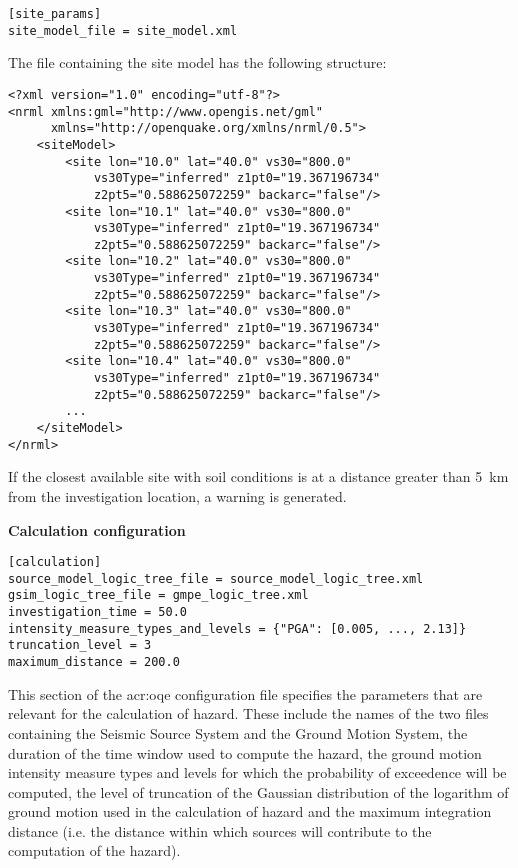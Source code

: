 \begin{verbatim}
[site_params]
site_model_file = site_model.xml
\end{verbatim}

The file containing the site model has the following structure:

\begin{verbatim}
<?xml version="1.0" encoding="utf-8"?>
<nrml xmlns:gml="http://www.opengis.net/gml"
      xmlns="http://openquake.org/xmlns/nrml/0.5">
    <siteModel>
        <site lon="10.0" lat="40.0" vs30="800.0" 
            vs30Type="inferred" z1pt0="19.367196734"
            z2pt5="0.588625072259" backarc="false"/>
        <site lon="10.1" lat="40.0" vs30="800.0" 
            vs30Type="inferred" z1pt0="19.367196734"
            z2pt5="0.588625072259" backarc="false"/>
        <site lon="10.2" lat="40.0" vs30="800.0" 
            vs30Type="inferred" z1pt0="19.367196734"
            z2pt5="0.588625072259" backarc="false"/>
        <site lon="10.3" lat="40.0" vs30="800.0" 
            vs30Type="inferred" z1pt0="19.367196734"
            z2pt5="0.588625072259" backarc="false"/>
        <site lon="10.4" lat="40.0" vs30="800.0" 
            vs30Type="inferred" z1pt0="19.367196734"
            z2pt5="0.588625072259" backarc="false"/>
        ...
    </siteModel>
</nrml>
\end{verbatim}
%

If the closest available site with soil conditions is at a distance greater than 5~km from the investigation location, a warning is generated.

\textbf{Calculation configuration}
\label{sec:calculation_configuration}

\begin{verbatim}
[calculation]
source_model_logic_tree_file = source_model_logic_tree.xml
gsim_logic_tree_file = gmpe_logic_tree.xml
investigation_time = 50.0
intensity_measure_types_and_levels = {"PGA": [0.005, ..., 2.13]}
truncation_level = 3
maximum_distance = 200.0
\end{verbatim}

This section of the \gls{acr:oqe} configuration file specifies the parameters that are relevant for the calculation of hazard. These include the names of the two files containing the Seismic Source System and the Ground Motion System, the duration of the time window used to compute the  hazard, the ground motion intensity measure types and levels for  which the probability of exceedence will be computed, the level of truncation of the Gaussian distribution of the logarithm of ground motion used in the calculation of hazard and the maximum integration distance (i.e. the distance within which sources will contribute to the computation of the hazard).

